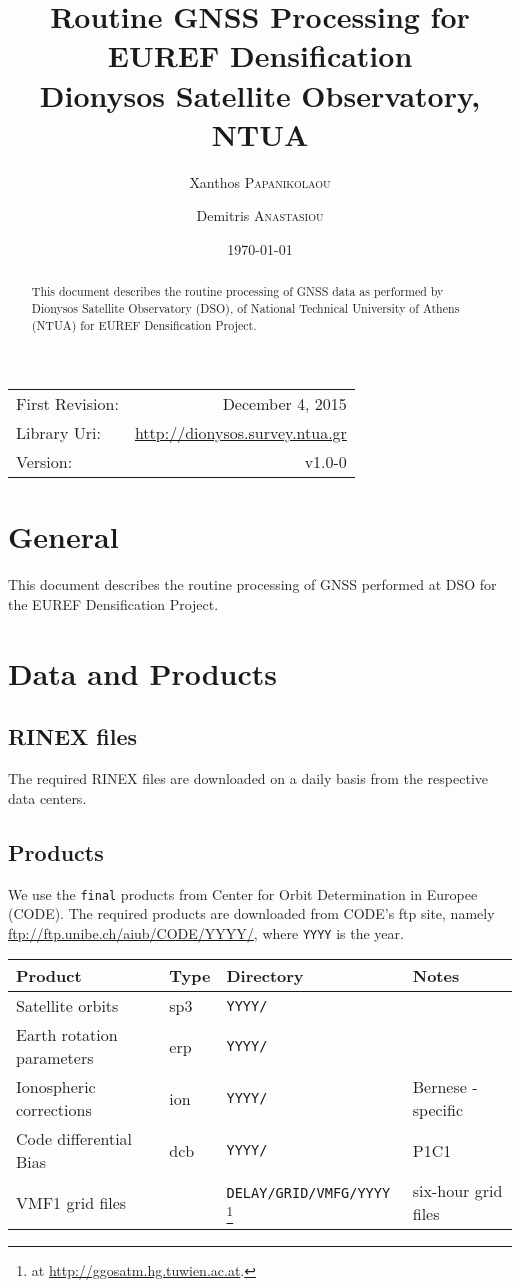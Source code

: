 \documentclass{article}
\title{Routine GNSS Processing for EUREF Densification\\ Dionysos Satellite Observatory, NTUA} %
\author{Xanthos \textsc{Papanikolaou} \and Demitris \textsc{Anastasiou}}
\date{\today} %
\begin{document}
\maketitle %

\begin{center}
\begin{tabular}{l r}
First Revision: & December 4, 2015 \\
Library Uri:    & \url{http://dionysos.survey.ntua.gr} \\
Version:        & v1.0-0
\end{tabular}
\end{center}

\begin{abstract}
{\small 
This document describes the routine processing of GNSS data as performed 
by Dionysos Satellite Observatory (DSO), of National Technical University of 
Athens (NTUA) for EUREF Densification Project.
}
\end{abstract}
\clearpage

\tableofcontents
\clearpage

\section{General}
This document describes the routine processing of GNSS performed at DSO for
the EUREF Densification Project.
\clearpage

\section{Data and Products}
\subsection{RINEX files}
The required RINEX files are downloaded on a daily basis from the respective
data centers.
\subsection{Products}
We use the \texttt{final} products from Center for Orbit Determination in Europee
(CODE). The required products are downloaded from CODE's ftp site, namely
\url{ftp://ftp.unibe.ch/aiub/CODE/YYYY/}, where \texttt{YYYY} is the year.
\begin{center}
\begin{tabular}{l l l l}
Product & Type & Directory & Notes\\
\hline
Satellite orbits & sp3 & \texttt{YYYY/} & \\
Earth rotation parameters & erp & \texttt{YYYY/} & \\
Ionospheric corrections & ion & \texttt{YYYY/} & Bernese - specific\\
Code differential Bias & dcb & \texttt{YYYY/} & P1C1\\
VMF1 grid files & & \texttt{DELAY/GRID/VMFG/YYYY} \footnote{at \url{http://ggosatm.hg.tuwien.ac.at}.} & six-hour grid files\\
\hline
\end{tabular}
\end{center}
\end{document}
